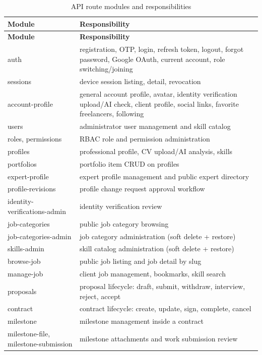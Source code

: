 \begin{longtable}{|L{4.2cm}|L{11.0cm}|}
\caption{API route modules and responsibilities}
\label{tab:modules}
\\
\hline
\textbf{Module} & \textbf{Responsibility} \\ \hline
\endfirsthead
\hline
\textbf{Module} & \textbf{Responsibility} \\ \hline
\endhead
auth & registration, OTP, login, refresh token, logout, forgot password, Google OAuth, current account, role switching/joining \\ \hline
sessions & device session listing, detail, revocation \\ \hline
account-profile & general account profile, avatar, identity verification upload/AI check, client profile, social links, favorite freelancers, following \\ \hline
users & administrator user management and skill catalog \\ \hline
roles, permissions & RBAC role and permission administration \\ \hline
profiles & professional profile, CV upload/AI analysis, skills \\ \hline
portfolios & portfolio item CRUD on profiles \\ \hline
expert-profile & expert profile management and public expert directory \\ \hline
profile-revisions & profile change request approval workflow \\ \hline
identity-verifications-admin & identity verification review \\ \hline
job-categories & public job category browsing \\ \hline
job-categories-admin & job category administration (soft delete + restore) \\ \hline
skills-admin & skill catalog administration (soft delete + restore) \\ \hline
browse-job & public job listing and job detail by slug \\ \hline
manage-job & client job management, bookmarks, skill search \\ \hline
proposals & proposal lifecycle: draft, submit, withdraw, interview, reject, accept \\ \hline
contract & contract lifecycle: create, update, sign, complete, cancel \\ \hline
milestone & milestone management inside a contract \\ \hline
milestone-file, milestone-submission & milestone attachments and work submission review \\ \hline

\end{longtable}
